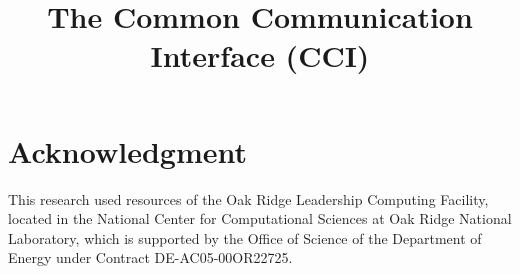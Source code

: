 \documentclass[conference]{IEEEtran}
\begin{document}
%
\title{The Common Communication Interface (CCI)}
% 
\author{
}

\maketitle




\IEEEpeerreviewmaketitle

\newcommand{\note}[1]{\colorbox{yellow!50}{Note: #1}}

\newcommand{\f}[1]{\texttt{#1{\kern-2pt}()}}

\newcommand{\us}{\hbox{\textmu}s\kern+3pt}








\section*{Acknowledgment}

This research used resources of the Oak
Ridge Leadership Computing Facility, located in the National
Center for Computational Sciences at Oak Ridge National
Laboratory, which is supported by the Office of Science of the
Department of Energy under Contract DE-AC05-00OR22725.





\end{document}
